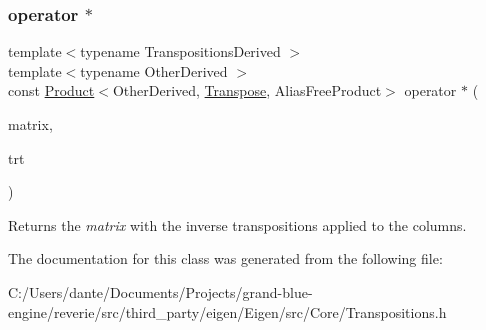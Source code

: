 \subsubsection{\texorpdfstring{operator $\ast$}{operator *}}
{\footnotesize\ttfamily template$<$typename Transpositions\+Derived $>$ \\
template$<$typename Other\+Derived $>$ \\
const \mbox{\hyperlink{class_eigen_1_1_product}{Product}}$<$Other\+Derived, \mbox{\hyperlink{class_eigen_1_1_transpose}{Transpose}}, Alias\+Free\+Product$>$ operator $\ast$ (\begin{DoxyParamCaption}\item[{const \mbox{\hyperlink{class_eigen_1_1_matrix_base}{Matrix\+Base}}$<$ Other\+Derived $>$ \&}]{matrix,  }\item[{const \mbox{\hyperlink{class_eigen_1_1_transpose}{Transpose}}$<$ \mbox{\hyperlink{class_eigen_1_1_transpositions_base}{Transpositions\+Base}}$<$ Transpositions\+Derived $>$ $>$ \&}]{trt }\end{DoxyParamCaption})\hspace{0.3cm}{\ttfamily [friend]}}

\begin{DoxyReturn}{Returns}
the {\itshape matrix} with the inverse transpositions applied to the columns. 
\end{DoxyReturn}


The documentation for this class was generated from the following file\+:\begin{DoxyCompactItemize}
\item 
C\+:/\+Users/dante/\+Documents/\+Projects/grand-\/blue-\/engine/reverie/src/third\+\_\+party/eigen/\+Eigen/src/\+Core/Transpositions.\+h\end{DoxyCompactItemize}
